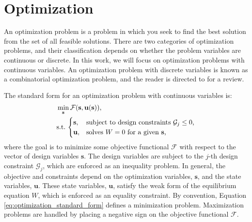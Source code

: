 
\section{Optimization}
\label{sec:optimization}

An optimization problem is a problem in which you seek to find the best solution from the set of all feasible solutions. There are two categories of optimization problems, and their classification depends on whether the problem variables are continuous or discrete. In this work, we will focus on optimization problems with continuous variables. An optimization problem with discrete variables is known as a combinatorial optimization problem, and the reader is directed to \citep{NW:88} for a review.

The standard form for an optimization problem with continuous variables is:
%
\begin{equation}
\label{eq:optimization_standard_form}
	\begin{aligned}
		&\min_{\mathbf{s}} \mathcal{F}(\mathbf{s}, \mathbf{u}(\mathbf{s})), \\
		&\text{s.t.\,}
		\begin{cases}
			\mathbf{s}, & \text{subject to design constraints}  \ \mathcal{G}_j \leq 0 \text{,}\\
			\mathbf{u}, & \text{solves} \ W= 0 \ \text{for a given $\mathbf{s}$,}
		\end{cases}
	\end{aligned}
\end{equation}
%
where the goal is to minimize some objective functional $\mathcal{F}$ with respect to the vector of design variables $\mathbf{s}$. The design variables are subject to the $j$-th design constraint $\mathcal{G}_j$, which are enforced as an inequality problem. In general, the objective and constraints depend on the optimization variables, $\mathbf{s}$, and the state variables, $\mathbf{u}$. These state variables, $\mathbf{u}$, satisfy the weak form of the equilibrium equation $W$, which is enforced as an equality constraint. By convention, Equation \ref{eq:optimization_standard_form} defines a minimization problem. Maximization problems are handled by placing a negative sign on the objective functional $\mathcal{F}$.


